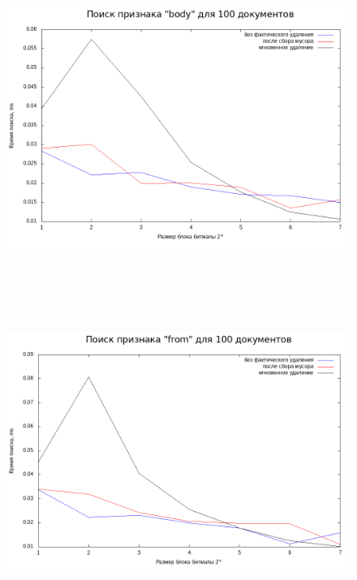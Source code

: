 \begin{figure}[H]
\includegraphics[width=\linewidth, height=10cm]{fig/limit_1/1e2/body_time.png}
\includegraphics[width=\linewidth, height=11cm]{fig/limit_1/1e2/from_time.png}
\end{figure}

